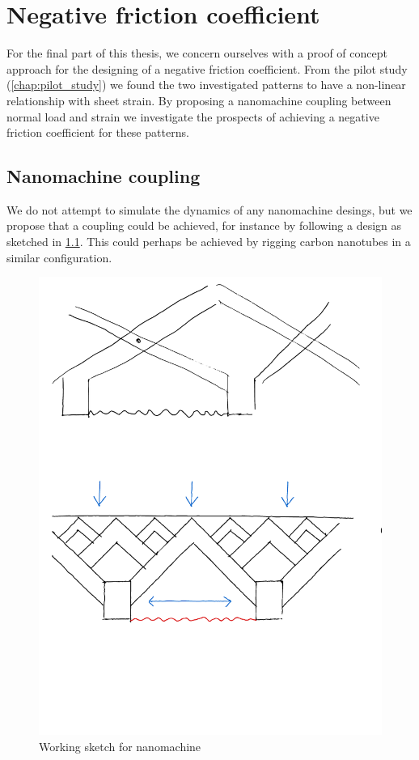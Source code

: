 \chapter{Negative friction coefficient}\label{chap:negative_coef}

For the final part of this thesis, we concern ourselves with a proof of concept approach for the designing of a negative friction coefficient. From the pilot study (\cref{chap:pilot_study}) we found the two investigated patterns to have a non-linear relationship with sheet strain. By proposing a nanomachine coupling between normal load and strain we investigate the prospects of achieving a negative friction coefficient for these patterns.

\section{Nanomachine coupling}
We do not attempt to simulate the dynamics of any nanomachine desings, but we propose that a coupling could be achieved, for instance by following a design as sketched in \cref{fig:nanomachine}. This could perhaps be achieved by rigging carbon nanotubes in a similar configuration. 

\begin{figure}[H]
  \centering
  \includegraphics[width=0.5\linewidth]{figures/negative_coefficient/nanomachine.pdf}
  \caption{Working sketch for nanomachine}
  \label{fig:nanomachine}
\end{figure}

